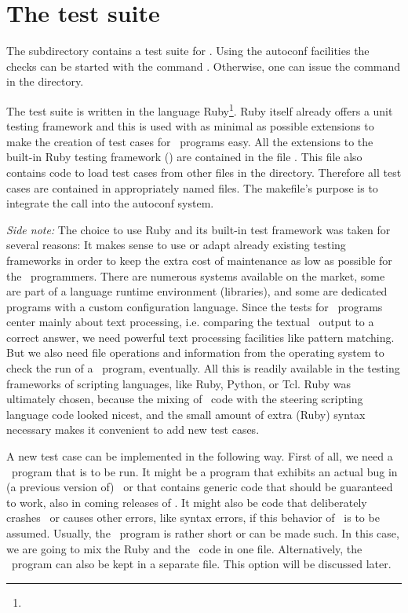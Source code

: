 \section{The test suite}

The subdirectory  contains a test suite for \FORM. Using the autoconf
facilities the checks can be started with the command .
Otherwise, one can issue the command  in the 
directory.

The test suite is written in the language
Ruby\footnote{}. Ruby itself already offers a
unit testing framework and this is used with as minimal as possible extensions
to make the creation of test cases for \FORM\ programs easy. All the extensions
to the built-in Ruby testing framework () are contained in the
file . This file also contains code to load test cases from other
 files in the  directory. Therefore all test cases are
contained in appropriately named  files. The makefile's purpose is to
integrate the call  into the autoconf system.

{\it Side note:}
The choice to use Ruby and its built-in test framework was taken for several
reasons: It makes sense to use or adapt already existing testing frameworks in
order to keep the extra cost of maintenance as low as possible for the \FORM\
programmers. There are numerous systems available on the market, some are part
of a language runtime environment (libraries), and some are dedicated programs
with a custom configuration language. Since the tests for \FORM\ programs center
mainly about text processing, i.e. comparing the textual \FORM\ output to a
correct answer, we need powerful text processing facilities like pattern
matching. But we also need file operations and information from the operating
system to check the run of a \FORM\ program, eventually. All this is readily
available in the testing frameworks of scripting languages, like Ruby, Python,
or Tcl. Ruby was ultimately chosen, because the mixing of \FORM\ code with the
steering scripting language code looked nicest, and the small amount of extra
(Ruby) syntax necessary makes it convenient to add new test cases.

A new test case can be implemented in the following way. First of all, we need a
\FORM\ program that is to be run. It might be a program that exhibits an actual
bug in (a previous version of) \FORM\ or that contains generic code that should
be guaranteed to work, also in coming releases of \FORM. It might also be code
that deliberately crashes \FORM\ or causes other errors, like syntax errors, if
this behavior of \FORM\ is to be assumed. Usually, the \FORM\ program is rather
short or can be made such. In this case, we are going to mix the Ruby and the
\FORM\ code in one file. Alternatively, the \FORM\ program can also be kept in a
separate file. This option will be discussed later.

